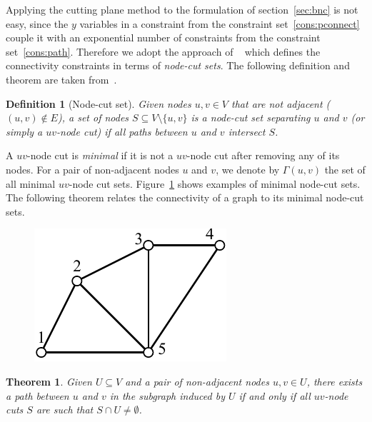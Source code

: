 \documentclass[conference]{IEEEtran}
\newtheorem{theorem}{Theorem}
\newtheorem{definition}{Definition}
\begin{document}
 
 Applying the cutting plane method to the formulation of section~\ref{sec:bnc} is not easy, since the $y$ variables in a constraint from the constraint set~\ref{cons:pconnect} couple it with an exponential number of constraints from the constraint set~\ref{cons:path}. Therefore we adopt the approach of ~\cite{CarvajalCGVW13} which defines the connectivity constraints in terms of \emph{node-cut sets}. The following definition and theorem are taken from~\cite{CarvajalCGVW13}.

\begin{definition}[Node-cut set]
Given nodes $u, v \in V$ that are not adjacent ($(u, v) \notin E$), a set of nodes $S \subseteq V \setminus \{u, v\}$ is a \emph{node-cut set} separating $u$ and $v$ (or simply a \emph{$uv$-node cut}) if all paths between $u$ and $v$ intersect $S$.
\end{definition}

A $uv$-node cut is \emph{minimal} if it is not a $uv$-node cut after removing any of its nodes. For a pair of non-adjacent nodes $u$ and $v$, we denote by $\Gamma(u, v)$ the set of all minimal $uv$-node cut sets. Figure~\ref{fig:cutset} shows examples of minimal node-cut sets. The following theorem relates the connectivity of a graph to its minimal node-cut sets. 

\begin{figure}
\centering
\includegraphics[scale=0.7]{images/cutset}
\captionsetup{font=small}
\label{fig:cutset}
\end{figure}

\begin{theorem}
Given $U \subseteq V$ and a pair of non-adjacent nodes $u, v \in U$, there exists a path between $u$ and $v$ in the subgraph induced by $U$ if and only if all $uv$-node cuts $S$ are such that $S \cap U \neq \emptyset$.
\label{theorem:cutset}
\end{theorem}
\end{document}
